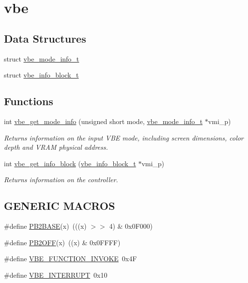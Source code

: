 \hypertarget{group__vbe}{}\section{vbe}
\label{group__vbe}
\subsection*{Data Structures}
\begin{DoxyCompactItemize}
\item 
struct \hyperlink{structvbe__mode__info__t}{vbe\+\_\+mode\+\_\+info\+\_\+t}
\item 
struct \hyperlink{structvbe__info__block__t}{vbe\+\_\+info\+\_\+block\+\_\+t}
\end{DoxyCompactItemize}
\subsection*{Functions}
\begin{DoxyCompactItemize}
\item 
int \hyperlink{group__vbe_ga4ef3234e41f2050bc094a22049b69e45}{vbe\+\_\+get\+\_\+mode\+\_\+info} (unsigned short mode, \hyperlink{structvbe__mode__info__t}{vbe\+\_\+mode\+\_\+info\+\_\+t} $\ast$vmi\+\_\+p)
\begin{DoxyCompactList}\small\item\em Returns information on the input V\+BE mode, including screen dimensions, color depth and V\+R\+AM physical address. \end{DoxyCompactList}\item 
int \hyperlink{group__vbe_ga4e9da75c9063842b969ad400e5700c0c}{vbe\+\_\+get\+\_\+info\+\_\+block} (\hyperlink{structvbe__info__block__t}{vbe\+\_\+info\+\_\+block\+\_\+t} $\ast$vmi\+\_\+p)
\begin{DoxyCompactList}\small\item\em Returns information on the controller. \end{DoxyCompactList}\end{DoxyCompactItemize}
\subsection*{G\+E\+N\+E\+R\+IC M\+A\+C\+R\+OS}
\begin{DoxyCompactItemize}
\item 
\#define \hyperlink{group__vbe_ga68b87c2339cb305d66b69b5551b96c73}{P\+B2\+B\+A\+SE}(x)~(((x) $>$$>$ 4) \& 0x0\+F000)
\item 
\#define \hyperlink{group__vbe_ga70c65ed4c6d71865daa96d31befb33fd}{P\+B2\+O\+FF}(x)~((x) \& 0x0\+F\+F\+F\+F)
\item 
\#define \hyperlink{group__vbe_ga9cb0519a88e2860f94e49d7444ee5725}{V\+B\+E\+\_\+\+F\+U\+N\+C\+T\+I\+O\+N\+\_\+\+I\+N\+V\+O\+KE}~0x4F
\item 
\#define \hyperlink{group__vbe_ga13e1037464e7407d1df6aa4041b180cd}{V\+B\+E\+\_\+\+I\+N\+T\+E\+R\+R\+U\+PT}~0x10
\end{DoxyCompactItemize}
